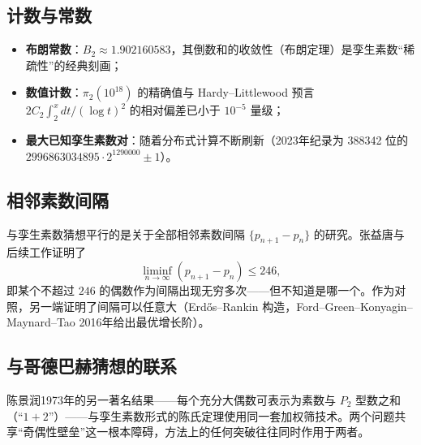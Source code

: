 \subsection{计数与常数}

\begin{itemize}
    \item \textbf{布朗常数}：$B_2 \approx 1.902160583$，其倒数和的收敛性（布朗定理）是孪生素数“稀疏性”的经典刻画\cite{brun1919}；
    \item \textbf{数值计数}：$\pi_2(10^{18})$ 的精确值与 Hardy--Littlewood 预言 $2C_2 \int_2^{x} dt/(\log t)^2$ 的相对偏差已小于 $10^{-5}$ 量级；
    \item \textbf{最大已知孪生素数对}：随着分布式计算不断刷新（2023年纪录为 388342 位的 $2996863034895 \cdot 2^{1290000} \pm 1$）。
\end{itemize}

\subsection{相邻素数间隔}

与孪生素数猜想平行的是关于全部相邻素数间隔 $\{p_{n+1} - p_n\}$ 的研究。张益唐与后续工作证明了
\begin{equation}
    \liminf_{n \to \infty} (p_{n+1} - p_n) \le 246,
\end{equation}
即某个不超过 $246$ 的偶数作为间隔出现无穷多次——但不知道是哪一个。作为对照，另一端证明了间隔可以任意大（Erd\H{o}s--Rankin 构造，Ford--Green--Konyagin--Maynard--Tao 2016年给出最优增长阶）。

\subsection{与哥德巴赫猜想的联系}

陈景润1973年的另一著名结果——每个充分大偶数可表示为素数与 $P_2$ 型数之和（“$1+2$”）\cite{chen1973twin}——与孪生素数形式的陈氏定理使用同一套加权筛技术。两个问题共享“奇偶性壁垒”这一根本障碍，方法上的任何突破往往同时作用于两者。
